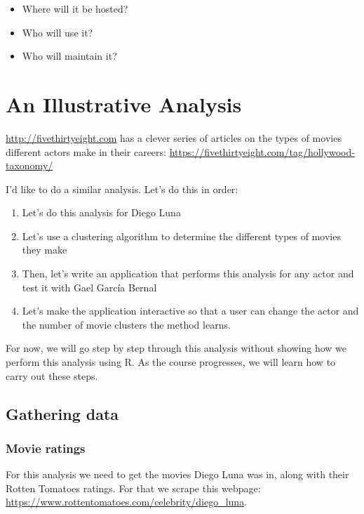 \documentclass[12pt,]{book}
\providecommand{\tightlist}{%
  \setlength{\itemsep}{0pt}\setlength{\parskip}{0pt}}
\theoremstyle{definition}
\theoremstyle{definition}
\theoremstyle{remark}
\begin{document}
\begin{itemize}
\tightlist
\item
  Where will it be hosted?
\item
  Who will use it?
\item
  Who will maintain it?
\end{itemize}

\chapter{An Illustrative Analysis}\label{an-illustrative-analysis}

\url{http://fivethirtyeight.com} has a clever series of articles on the
types of movies different actors make in their careers:
\url{https://fivethirtyeight.com/tag/hollywood-taxonomy/}

I'd like to do a similar analysis. Let's do this in order:

\begin{enumerate}
\def\labelenumi{\arabic{enumi})}
\tightlist
\item
  Let's do this analysis for Diego Luna
\item
  Let's use a clustering algorithm to determine the different types of
  movies they make
\item
  Then, let's write an application that performs this analysis for any
  actor and test it with Gael García Bernal
\item
  Let's make the application interactive so that a user can change the
  actor and the number of movie clusters the method learns.
\end{enumerate}

For now, we will go step by step through this analysis without showing
how we perform this analysis using R. As the course progresses, we will
learn how to carry out these steps.

\section{Gathering data}\label{gathering-data}

\subsection{Movie ratings}\label{movie-ratings}

For this analysis we need to get the movies Diego Luna was in, along
with their Rotten Tomatoes ratings. For that we scrape this webpage:
\url{https://www.rottentomatoes.com/celebrity/diego_luna}.
\end{document}
